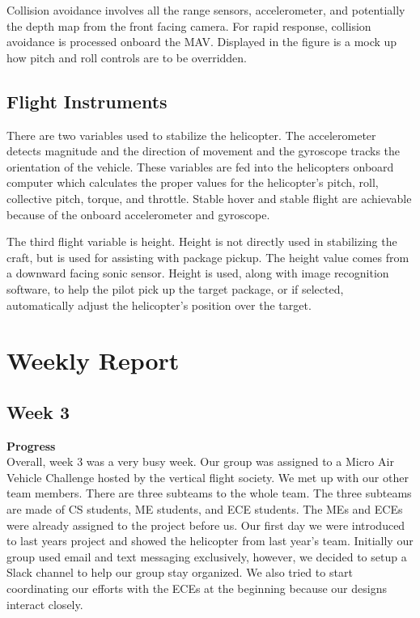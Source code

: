\documentclass[onecolumn, oneside, letterpaper, draftclsnofoot, 10pt, compsoc]{IEEEtran}
\begin{document}
\noindent
Collision avoidance involves all the range sensors, accelerometer, and potentially the depth map from the front facing camera. For rapid response, collision avoidance is processed onboard the MAV. Displayed in the figure is a mock up how pitch and roll controls are to be overridden.

\subsection{Flight Instruments}
There are two variables used to stabilize the helicopter. The accelerometer detects magnitude and the direction of movement and the gyroscope tracks the orientation of the vehicle. These variables are fed into the helicopter\textquotesingle s onboard computer which calculates the proper values for the helicopter’s pitch, roll, collective pitch, torque, and throttle. Stable hover and stable flight are achievable because of the onboard accelerometer and gyroscope.

\noindent
The third flight variable is height. Height is not directly used in stabilizing the craft, but is used for assisting with package pickup. The height value comes from a downward facing sonic sensor. Height is used, along with image recognition software, to help the pilot pick up the target package, or if selected, automatically adjust the helicopter’s position over the target.


\section{Weekly Report}

\subsection{Week 3}
\noindent \textbf{Progress}\\ \noindent
Overall, week 3 was a very busy week. Our group was assigned to a Micro Air Vehicle Challenge hosted by the vertical flight society. We met up with our other team members. There are three subteams to the whole team. The three subteams are made of CS students, ME students, and ECE students. The MEs and ECEs were already assigned to the project before us. Our first day we were introduced to last year\textquotesingle s project and showed the helicopter from last year’s team. Initially our group used email and text messaging exclusively, however, we decided to setup a Slack channel to help our group stay organized. We also tried to start coordinating our efforts with the ECEs at the beginning because our designs interact closely.
\end{document}
